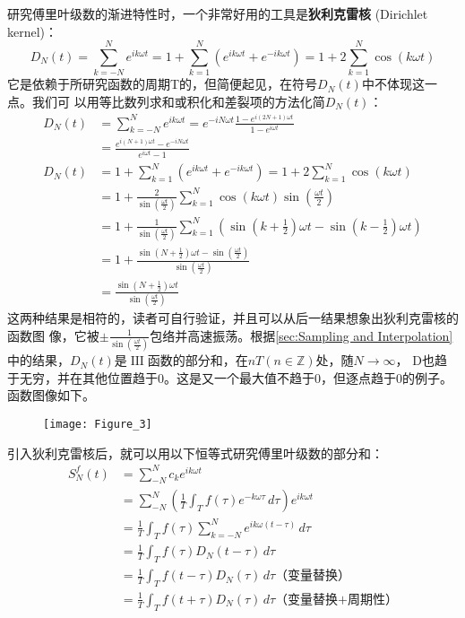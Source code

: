 \documentclass{ctexbook}
\newcommand{\shah}{\operatorname{III}}
\begin{document}
研究傅里叶级数的渐进特性时，一个非常好用的工具是\textbf{狄利克雷核} (Dirichlet kernel)：
\[D_N(t)=\sum_{k=-N}^{N}e^{ik\omega t}=1+\sum_{k=1}^{N}(e^{ik\omega t}+e^{-ik\omega t})=1+2\sum_{k=1}^{N}\cos(k\omega t)\]
它是依赖于所研究函数的周期T的，但简便起见，在符号$D_N(t)$中不体现这一点。我们可
以用等比数列求和或积化和差裂项的方法化简$D_N(t)$：
\begin{align}
    D_N(t) & =\sum_{k=-N}^{N}e^{ik\omega t}=e^{-iN\omega t}\frac{1-e^{i(2N+1)\omega t}}{1-e^{i\omega t}}                  \\
           & =\frac{e^{i(N+1)\omega t}-e^{-iN\omega t}}{e^{i\omega t}-1}\label{eq:2.8}                                    \\
    D_N(t) & =1+\sum_{k=1}^{N}(e^{ik\omega t}+e^{-ik\omega t})=1+2\sum_{k=1}^{N}\cos(k\omega t)\label{eq:2.9}             \\
           & =1+\frac{2}{\sin(\frac{\omega t}{2})}\sum_{k=1}^{N}\cos(k\omega t)\sin(\frac{\omega t}{2})                   \\
           & =1+\frac{1}{\sin(\frac{\omega t}{2})}\sum_{k=1}^{N}(\sin(k+\frac{1}{2})\omega t-\sin(k-\frac{1}{2})\omega t) \\
           & =1+\frac{\sin(N+\frac{1}{2})\omega t-\sin(\frac{\omega t}{2})}{\sin(\frac{\omega t}{2})}                     \\
           & =\frac{\sin(N+\frac{1}{2})\omega t}{\sin(\frac{\omega t}{2})}
\end{align}
这两种结果是相符的，读者可自行验证，并且可以从后一结果想象出狄利克雷核的函数图
像，它被$\pm \frac{1}{\sin(\frac{\omega t}{2})}$包络并高速振荡。根据\ref{sec:Sampling and Interpolation}
中的结果，$D_N(t)$是$\shah$函数的部分和，在$nT(n\in\mathbb{Z})$处，随$N\to\infty$，
D也趋于无穷，并在其他位置趋于0。这是又一个最大值不趋于0，但逐点趋于0的例子。函数图像如下。
\begin{figure}[htbp]
    \centering
    \texttt{[image: Figure\_3]}
\end{figure}

引入狄利克雷核后，就可以用以下恒等式研究傅里叶级数的部分和：
\begin{align*}
    S_N^f(t) & =\sum_{-N}^{N}c_k e^{ik\omega t}                                                  \\
             & =\sum_{-N}^{N}(\frac{1}{T}\int_{T}f(\tau)e^{-k\omega \tau}\,d\tau) e^{ik\omega t} \\
             & =\frac{1}{T}\int_{T}f(\tau)\sum_{k=-N}^{N}e^{ik\omega (t-\tau)}\,d\tau            \\
             & =\frac{1}{T}\int_{T}f(\tau)D_N(t-\tau)\,d\tau                                     \\
             & =\frac{1}{T}\int_{T}f(t-\tau)D_N(\tau)\,d\tau\text{（变量替换）}                        \\
             & =\frac{1}{T}\int_{T}f(t+\tau)D_N(\tau)\,d\tau\text{（变量替换+周期性）}
\end{align*}
\end{document}
